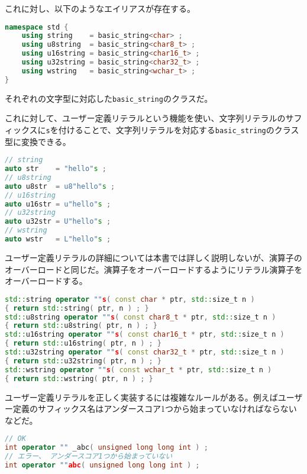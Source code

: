 \ifTombow\pagebreak\fi
これに対し、以下のようなエイリアスが存在する。

\begin{lstlisting}[language={C++}]
namespace std {
    using string    = basic_string<char> ;
    using u8string  = basic_string<char8_t> ;
    using u16string = basic_string<char16_t> ;
    using u32string = basic_string<char32_t> ;  
    using wstring   = basic_string<wchar_t> ;
}
\end{lstlisting}

それぞれの文字型に対応した\texttt{basic\_string}のクラスだ。

これに対して、ユーザー定義リテラルという機能を使い、文字列リテラルのサフィックスに\texttt{s}を付けることで、文字列リテラルを対応する\texttt{basic\_string}のクラス型に変換できる。

\begin{lstlisting}[language={C++}]
// string
auto str    = "hello"s ;
// u8string
auto u8str  = u8"hello"s ;
// u16string
auto u16str = u"hello"s ;
// u32string
auto u32str = U"hello"s ;
// wstring
auto wstr   = L"hello"s ;
\end{lstlisting}

ユーザー定義リテラルの詳細については本書では詳しく説明しないが、演算子のオーバーロードと同じだ。演算子をオーバーロードするようにリテラル演算子をオーバーロードする。

\begin{lstlisting}[language={C++}]
std::string operator ""s( const char * ptr, std::size_t n )
{ return std::string( ptr, n ) ; }
std::u8string operator ""s( const char8_t * ptr, std::size_t n )
{ return std::u8string( ptr, n ) ; }
std::u16string operator ""s( const char16_t * ptr, std::size_t n )
{ return std::u16string( ptr, n ) ; }
std::u32string operator ""s( const char32_t * ptr, std::size_t n )
{ return std::u32string( ptr, n ) ; }
std::wstring operator ""s( const wchar_t * ptr, std::size_t n )
{ return std::wstring( ptr, n ) ; }
\end{lstlisting}

ユーザー定義リテラルを正しく実装するには複雑なルールがある。例えばユーザー定義のサフィックス名はアンダースコア1つから始まっていなければならないなどだ。

\ifTombow\pagebreak\fi
\begin{lstlisting}[language={C++}]
// OK
int operator "" _abc( unsigned long long int ) ;
// エラー、 アンダースコア1つから始まっていない
int operator ""abc( unsigned long long int ) ;
\end{lstlisting}

